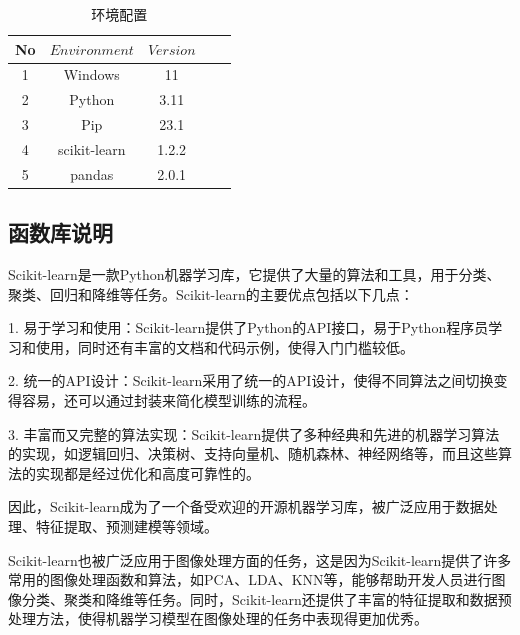 \documentclass[UTF8]{ctexart}
\begin{document}
\begin{table}[H]
    \centering
    \caption{环境配置}
    \begin{tabular}{ccccc}
    \hline
    No  & $Environment$    & $Version$     \\
    \hline
    1   & Windows  & 11  \\ 
    2   & Python  & 3.11 \\ 
    3   & Pip  & 23.1  \\ 
    4   & scikit-learn  & 1.2.2  \\ 
    5   & pandas & 2.0.1 \\
    \hline
    \end{tabular}   
  \label{tab1}
\end{table}

\subsection{函数库说明}
Scikit-learn是一款Python机器学习库，它提供了大量的算法和工具，用于分类、聚类、回归和降维等任务。Scikit-learn的主要优点包括以下几点：

1.	易于学习和使用：Scikit-learn提供了Python的API接口，易于Python程序员学习和使用，同时还有丰富的文档和代码示例，使得入门门槛较低。

2. 统一的API设计：Scikit-learn采用了统一的API设计，使得不同算法之间切换变得容易，还可以通过封装来简化模型训练的流程。

3.	丰富而又完整的算法实现：Scikit-learn提供了多种经典和先进的机器学习算法的实现，如逻辑回归、决策树、支持向量机、随机森林、神经网络等，而且这些算法的实现都是经过优化和高度可靠性的。

因此，Scikit-learn成为了一个备受欢迎的开源机器学习库，被广泛应用于数据处理、特征提取、预测建模等领域。

Scikit-learn也被广泛应用于图像处理方面的任务，这是因为Scikit-learn提供了许多常用的图像处理函数和算法，如PCA、LDA、KNN等，能够帮助开发人员进行图像分类、聚类和降维等任务。同时，Scikit-learn还提供了丰富的特征提取和数据预处理方法，使得机器学习模型在图像处理的任务中表现得更加优秀。
\end{document}
